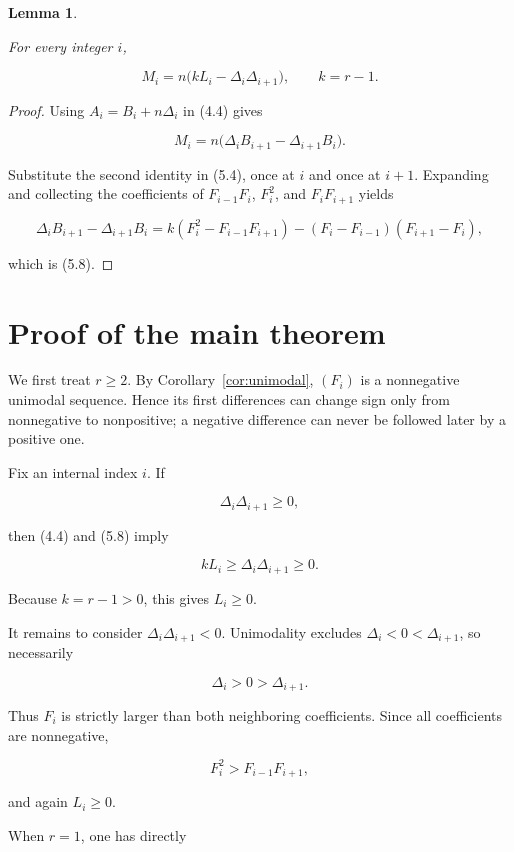 \documentclass[11pt]{article}
\newtheorem{lemma}[theorem]{Lemma}
\begin{document}
\Needspace{0.18\textheight}
\begin{lemma}
\label{lem:determinant}

For every integer $i$,

\[
M_i=n\bigl(kL_i-\Delta_i\Delta_{i+1}\bigr),
\qquad k=r-1.
\tag{5.8}
\]

\end{lemma}

\begin{proof}

Using $A_i=B_i+n\Delta_i$ in (4.4) gives

\[
M_i=n\bigl(\Delta_iB_{i+1}-\Delta_{i+1}B_i\bigr).
\]

Substitute the second identity in (5.4), once at $i$ and once at $i+1$. Expanding and collecting
the coefficients of $F_{i-1}F_i$, $F_i^2$, and $F_iF_{i+1}$ yields

\[
\Delta_iB_{i+1}-\Delta_{i+1}B_i
=k(F_i^2-F_{i-1}F_{i+1})
-(F_i-F_{i-1})(F_{i+1}-F_i),
\]

which is (5.8).
\end{proof}


\section{Proof of the main theorem}


We first treat $r\geq2$. By Corollary~\ref{cor:unimodal}, $(F_i)$ is a nonnegative unimodal sequence. Hence its
first differences can change sign only from nonnegative to nonpositive; a negative difference can
never be followed later by a positive one.

Fix an internal index $i$. If

\[
\Delta_i\Delta_{i+1}\geq0,
\]

then (4.4) and (5.8) imply

\[
kL_i\geq\Delta_i\Delta_{i+1}\geq0.
\]

Because $k=r-1>0$, this gives $L_i\geq0$.

It remains to consider $\Delta_i\Delta_{i+1}<0$. Unimodality excludes
$\Delta_i<0<\Delta_{i+1}$, so necessarily

\[
\Delta_i>0>\Delta_{i+1}.
\]

Thus $F_i$ is strictly larger than both neighboring coefficients. Since all coefficients are
nonnegative,

\[
F_i^2>F_{i-1}F_{i+1},
\]

and again $L_i\geq0$.

When $r=1$, one has directly
\end{document}
